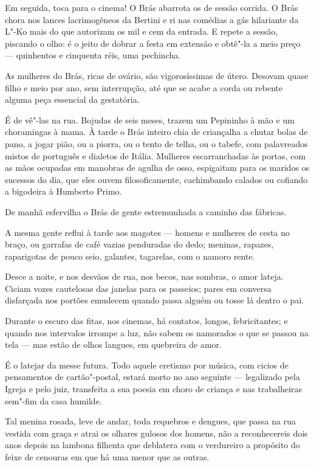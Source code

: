 Em seguida, toca para o cinema! O Brás abarrota os de sessão corrida. O
Brás chora nos lances lacrimogêneos da Bertini e ri nas comédias a gás
hilariante da L"-Ko mais do que autorizam os mil e cem da entrada. E
repete a sessão, piscando o olho: é o jeito de dobrar a festa em
extensão e obtê"-la a meio preço --- quinhentos e cinquenta réis, uma
pechincha.

As mulheres do Brás, ricas de ovário, são vigorosíssimas de útero.
Desovam quase filho e meio por ano, sem interrupção, até que se acabe a
corda ou rebente alguma peça essencial da gestatória.

É de vê"-las na rua. Bojudas de seis meses, trazem um Pepininho à mão e
um choramingas à mama. À tarde o Brás inteiro chia de criançalha a
chutar bolas de pano, a jogar pião, ou a piorra, ou o tento de telha, ou
o tabefe, com palavreados mistos de português e dialetos de Itália.
Mulheres escarranchadas às portas, com as mãos ocupadas em manobras de
agulha de osso, espigaitam para os maridos os sucessos do dia, que eles
ouvem filosoficamente, cachimbando calados ou cofiando a bigodeira à
Humberto Primo.

De manhã esfervilha o Brás de gente estremunhada a caminho das fábricas.

A mesma gente reflui à tarde aos magotes --- homens e mulheres de cesta
no braço, ou garrafas de café vazias penduradas do dedo; meninas,
rapazes, raparigotas de pouco seio, galantes, tagarelas, com o namoro
rente.

Desce a noite, e nos desvãos de rua, nos becos, nas sombras, o amor
lateja. Ciciam vozes cautelosas das janelas para os passeios; pares em
conversa disfarçada nos portões emudecem quando passa alguém ou tosse lá
dentro o pai.

Durante o escuro das fitas, nos cinemas, há contatos, longos,
febricitantes; e quando nos intervalos irrompe a luz, não sabem os
namorados o que se passou na tela --- mas estão de olhos langues, em
quebreira de amor.

É o latejar da messe futura. Todo aquele eretismo por música, com cicios
de pensamentos de cartão"-postal, estará morto no ano seguinte ---
legalizado pela Igreja e pelo juiz, transfeita a sua poesia em choro de
criança e nas trabalheiras sem"-fim da casa humilde.

Tal menina rosada, leve de andar, toda requebros e dengues, que passa na
rua vestida com graça e atrai os olhares gulosos dos homens, não a
reconhecereis dois anos depois na lambona filhenta que deblatera com o
verdureiro a propósito do feixe de cenouras em que há uma menor que as
outras.

